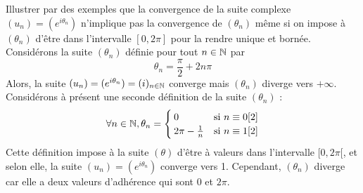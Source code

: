 \documentclass{article}
\renewenvironment{question_kholle}[2][ ]
{
	\subsection{\texorpdfstring{#2}{}}
	\notblank{#1}
	{
		\noindent #1
		\bigbreak
	}
	{}
	\begin{proof}
}
{
	\end{proof}
}
\begin{document}
\begin{question_kholle}{Illustrer par des exemples que la convergence
		de la suite complexe $(u_{n})=(e^{i \theta_{n}})$ n’implique pas la
		convergence de $(\theta_{n})$ même si on impose à $(\theta_{n})$
		d’être dans l’intervalle $[0,2 \pi]$ pour la rendre unique et bornée.}
	Considérons la suite $(\theta_{n})$ définie pour tout $n\in\mathbb N$ par
	\[
		\theta_{n}=\frac{\pi}{2}+2n \pi
	\]
	Alors, la suite $(u_{n})=(e^{i \theta_{n}}) = (i)_{n\in\mathbb N}$
	converge mais $(\theta_{n})$ diverge vers $+\infty$.\\
	Considérons à présent une seconde définition de la suite $(\theta_{n})$ :
	\[
		\forall n\in\mathbb N, \theta_{n}=
		\begin{cases}
			0                   & \text{si } n\equiv 0[2] \\
			2 \pi - \frac{1}{n} & \text{si } n\equiv 1[2]
		\end{cases}
	\]
	Cette définition impose à la suite $(\theta)$ d’être à valeurs dans
	l’intervalle $[0,2 \pi[$, et selon elle, la suite $(u_{n})=(e^{i
				\theta_{n}})$ converge vers 1. Cependant, $(\theta_{n})$ diverge
	car elle a deux valeurs d’adhérence qui sont $0$ et $2 \pi$.

\end{question_kholle}
\end{document}

